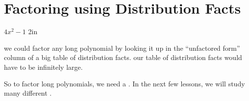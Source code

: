 \section{Factoring using Distribution Facts}

    {$4x^2-1$}
    {2in}

\vspace{2\onelineskip}

  we could factor any long polynomial 
by looking it up in the ``unfactored form'' column of 
a big table of distribution facts.
  our table of distribution facts would have to be 
infinitely large.

So to factor long polynomials, we need a .
In the next few lessons,
we will study many different  .